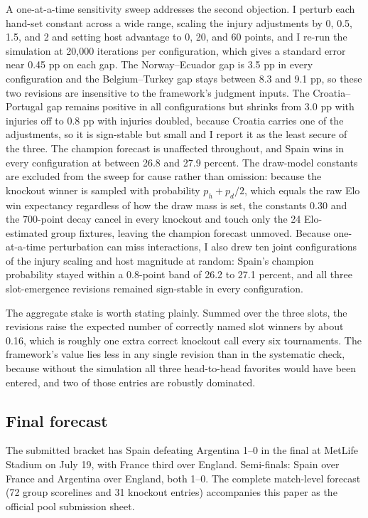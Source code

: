 \documentclass[11pt,letterpaper]{article}
\begin{document}
A one-at-a-time sensitivity sweep addresses the second objection. I perturb each hand-set constant across a wide range, scaling the injury adjustments by 0, 0.5, 1.5, and 2 and setting host advantage to 0, 20, and 60 points, and I re-run the simulation at 20{,}000 iterations per configuration, which gives a standard error near 0.45 pp on each gap. The Norway--Ecuador gap is 3.5 pp in every configuration and the Belgium--Turkey gap stays between 8.3 and 9.1 pp, so these two revisions are insensitive to the framework's judgment inputs. The Croatia--Portugal gap remains positive in all configurations but shrinks from 3.0 pp with injuries off to 0.8 pp with injuries doubled, because Croatia carries one of the adjustments, so it is sign-stable but small and I report it as the least secure of the three. The champion forecast is unaffected throughout, and Spain wins in every configuration at between 26.8 and 27.9 percent. The draw-model constants are excluded from the sweep for cause rather than omission: because the knockout winner is sampled with probability $p_h + p_d/2$, which equals the raw Elo win expectancy regardless of how the draw mass is set, the constants $0.30$ and the 700-point decay cancel in every knockout and touch only the 24 Elo-estimated group fixtures, leaving the champion forecast unmoved. Because one-at-a-time perturbation can miss interactions, I also drew ten joint configurations of the injury scaling and host magnitude at random: Spain's champion probability stayed within a 0.8-point band of 26.2 to 27.1 percent, and all three slot-emergence revisions remained sign-stable in every configuration.

The aggregate stake is worth stating plainly. Summed over the three slots, the revisions raise the expected number of correctly named slot winners by about 0.16, which is roughly one extra correct knockout call every six tournaments. The framework's value lies less in any single revision than in the systematic check, because without the simulation all three head-to-head favorites would have been entered, and two of those entries are robustly dominated.

\subsection{Final forecast}

The submitted bracket has Spain defeating Argentina 1--0 in the final at MetLife Stadium on July 19, with France third over England. Semi-finals: Spain over France and Argentina over England, both 1--0. The complete match-level forecast (72 group scorelines and 31 knockout entries) accompanies this paper as the official pool submission sheet.
\end{document}
